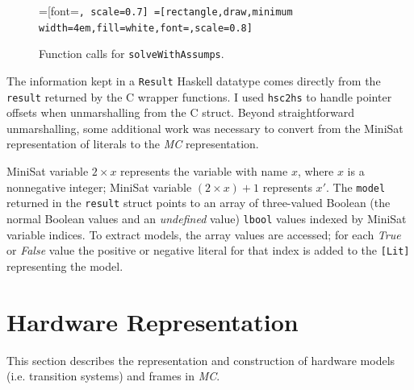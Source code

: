 \documentclass[12pt,a4paper,twoside,openright]{report}
\begin{document}
{{\begin{figure}[t]
\centering
{}=[font=\small\tt, scale=0.7]
=[rectangle,draw,minimum width=4em,fill=white,font=\small\tt,scale=0.8]
\caption{Function calls for {\tt solveWithAssumps}.}
\label{solveWithAssumps}
\end{figure}

The information kept in a \verb,Result, Haskell datatype comes directly from the
\verb,result, returned by the C wrapper functions.
I used \verb,hsc2hs, to handle pointer offsets
when unmarshalling from the C struct.
Beyond straightforward unmarshalling, some additional work was necessary
to convert from the MiniSat representation of literals to the \emph{MC} representation.

MiniSat variable $2 \times x$ represents the variable with name $x$, where $x$ is a nonnegative
integer; MiniSat variable $(2 \times x) + 1$ represents
$x'$.
The \verb,model, returned in the \verb,result, struct
points to an array of three-valued Boolean (the normal Boolean values and an
\emph{undefined} value) \verb,lbool, values indexed by MiniSat variable indices.
To extract models, the array values are accessed; for each \emph{True} or \emph{False}
value the positive or negative literal for that index is added to the
\verb,[Lit], representing the model.

\section{Hardware Representation}
\label{impl:representation}
This section describes the representation and construction of hardware models (i.e.
transition systems) and frames in \emph{MC}.

}}
\end{document}
